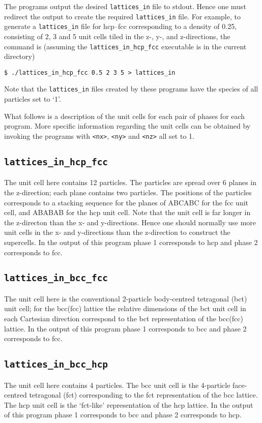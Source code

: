 \documentclass{report}
\begin{document}
The programs output the desired \texttt{lattices\_in} file to stdout. Hence one must redirect the output
to create the required \texttt{lattices\_in} file.
For example, to generate a \texttt{lattices\_in} file for hcp--fcc corresponding to a density of 0.25, consisting
of 2, 3 and 5 unit cells tiled in the z-, y-, and z-directions, the command is (assuming the \texttt{lattices\_in\_hcp\_fcc} executable
is in the current directory)
\begin{verbatim}
$ ./lattices_in_hcp_fcc 0.5 2 3 5 > lattices_in
\end{verbatim}
Note that the \texttt{lattices\_in} files created by these programs have the species of all particles set to `1'.

What follows is a description of the unit cells for each pair of phases for each program. More specific information regarding the unit
cells can be obtained by invoking the programs with \texttt{<nx>}, \texttt{<ny>} and \texttt{<nz>} all set to 1. 

\subsection{\texttt{lattices\_in\_hcp\_fcc}}
The unit cell here contains 12 particles. The particles are spread over 6 planes in the z-direction; each plane contains two particles. The positions
of the particles corresponds to a stacking sequence for the planes of ABCABC for the fcc unit cell, and  ABABAB for the hcp unit cell. 
Note that the unit cell is far longer in the z-directon than the x- and y-directions. Hence one should normally use more unit cells in 
the x- and y-directions than the z-direction to construct the supercells. In the output of this program phase 1 corresponds to hcp and
phase 2 corresponds to fcc.

\subsection{\texttt{lattices\_in\_bcc\_fcc}}
The unit cell here is the conventional 2-particle body-centred tetragonal (bct) unit cell; for the bcc(fcc) lattice the relative dimensions of 
the bct unit cell in each Cartesian direction correspond to the bct representation of the bcc(fcc) lattice. In the output of this program
phase 1 corresponds to bcc and phase 2 corresponds to fcc.

\subsection{\texttt{lattices\_in\_bcc\_hcp}}
The unit cell here contains 4 particles. The bcc unit cell is the 4-particle face-centred tetragonal (fct) corresponding to the fct representation of 
the bcc lattice. The hcp unit cell is the `fct-like' representation of the hcp lattice. In the output of this program
phase 1 corresponds to bcc and phase 2 corresponds to hcp.
\end{document}
